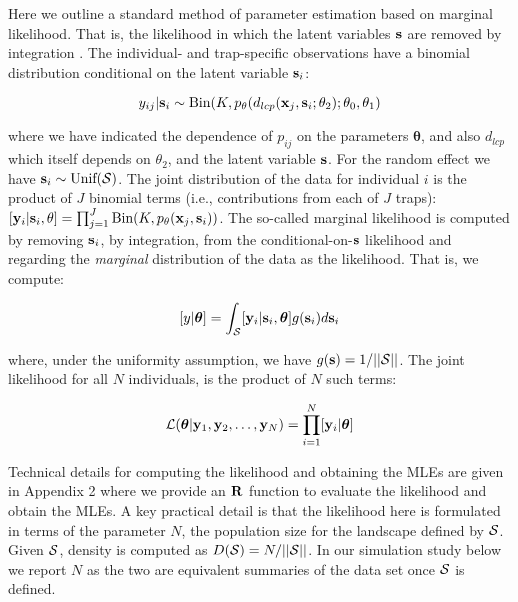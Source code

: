 Here we outline a standard method of parameter estimation based on
marginal likelihood. That is, the likelihood in which the latent
variables ${\bf s}$ are removed by integration \citep{borchers_efford:2008}.
The individual- and trap-specific observations have a binomial
distribution conditional on the latent variable ${\bf s}_{i}$:

\begin{equation}
	y_{ij}| {\bf s}_{i} \sim \mbox{Bin}(K, p_{\theta}(d_{lcp}({\bf x}_{j},{\bf s}_{i};\theta_{2}); \theta_{0}, \theta_{1})
\label{mle.eq.cond-on-s}
\end{equation}

{\flushleft where} we have indicated the dependence of $p_{ij}$ on the parameters
${\bm \theta}$, and also $d_{lcp}$ which
itself depends on $\theta_{2}$, and the latent variable ${\bf s}$.
For the random effect we have ${\bf s}_{i} \sim  \mbox{Unif}({\cal
  S})$.
The joint distribution of the data for individual $i$ is the product
of $J$ binomial terms (i.e., contributions from each of $J$ traps):
$  [{\bf y}_{i} | {\bf s}_{i} , \theta] =
  \prod_{j=1}^{J} \mbox{Bin}(K, p_{\theta}({\bf x}_{j},{\bf s}_{i}) )$.
 The so-called marginal likelihood is computed by removing
${\bf s}_{i}$, by integration,  from the conditional-on-${\bf s}$
likelihood and regarding the {\it marginal} distribution of the data
as the likelihood. That
is, we compute:

\[
  [y|{\bm \theta}] =
\int_{{\cal S}}  [ {\bf y}_{i} |{\bf s}_{i},{\bm \theta}] g({\bf s}_{i}) d{\bf s}_{i}
\]

{\flushleft where}, under the uniformity assumption, we have
$g({\bf s}) = 1/||{\cal S}||$.
The joint likelihood for all $N$ individuals, 
is the product of $N$ such terms:

\[
{\cal L}({\bm \theta} | {\bf y}_{1},{\bf y}_{2},\ldots, {\bf y}_{N}) = \prod_{i=1}^{N}
[{\bf y}_{i}|{\bm \theta}]
\]

Technical details for computing the likelihood and obtaining the MLEs
are given in Appendix 2 where we provide an ${\bf R}$ function
to evaluate the likelihood and obtain the MLEs.
A key practical detail is that the likelihood here is formulated in
terms of the parameter $N$, the population size for the landscape
defined by ${\cal S}$. Given ${\cal S}$, density
is
computed as $D({\cal S}) = N/||{\cal S}||$. In our simulation study
below we report $N$ as the two are equivalent summaries of the data
set once ${\cal S}$ is defined.


